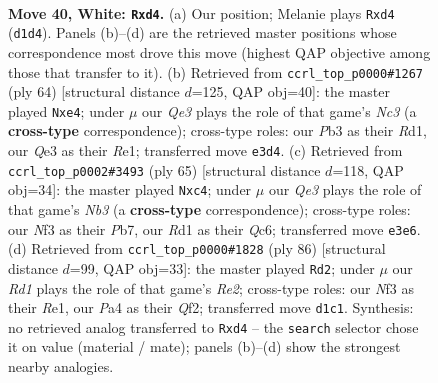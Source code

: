 \documentclass[11pt]{article}
\begin{document}
\clearpage

\begin{figure}[p]\centering
\begin{subfigure}{0.46\textwidth}\centering
\resizebox{\linewidth}{!}{%
\newchessgame
\chessboard[
  setfen={rnbr1q2/1p4k1/4p3/p4p1p/PnNp1P2/1P2QNP1/4B1KP/3R3R w - - 0 40},
  showmover=false,
  pgfstyle=straightmove, color=movearrow, markmove={d1-d4}
]}
\caption{}
\end{subfigure}\hfill
\begin{subfigure}{0.46\textwidth}\centering
\resizebox{\linewidth}{!}{%
\newchessgame
\chessboard[
  setfen={b1r3k1/2q1b1p1/p3pn2/2p2r2/2N1p2p/2NB1P2/PP1Q2PP/3RR2K w - - 0 33},
  showmover=false,
  pgfstyle=straightmove, color=movearrow, markmove={c3-e4}
]}
\caption{}
\end{subfigure}
\\[4pt]
\begin{subfigure}{0.46\textwidth}\centering
\resizebox{\linewidth}{!}{%
\newchessgame
\chessboard[
  setfen={2r5/1p3rkp/1nqp2p1/4p3/2P1PpP1/PQ1N1P2/2R4P/3R3K b - - 4 33},
  showmover=false,
  pgfstyle=straightmove, color=movearrow, markmove={b6-c4}
]}
\caption{}
\end{subfigure}\hfill
\begin{subfigure}{0.46\textwidth}\centering
\resizebox{\linewidth}{!}{%
\newchessgame
\chessboard[
  setfen={3r2k1/1b1qr1p1/p3pp1p/P7/1pNP4/1PnB2PP/4RQPK/4R3 w - - 31 44},
  showmover=false,
  pgfstyle=straightmove, color=movearrow, markmove={e2-d2}
]}
\caption{}
\end{subfigure}
\caption{\textbf{Move 40, White: \texttt{Rxd4}.} (a) Our position; Melanie plays \texttt{Rxd4} (\texttt{d1d4}). Panels (b)--(d) are the retrieved master positions whose correspondence most drove this move (highest QAP objective among those that transfer to it). (b) Retrieved from \texttt{ccrl\_top\_p0000\#1267} (ply 64) [structural distance $d$=125, QAP obj=40]: the master played \texttt{Nxe4}; under $\mu$ our \emph{Qe3} plays the role of that game's \emph{Nc3} (a \textbf{cross-type} correspondence); cross-type roles: our \emph{P}b3 as their \emph{R}d1, our \emph{Q}e3 as their \emph{R}e1; transferred move \texttt{e3d4}. (c) Retrieved from \texttt{ccrl\_top\_p0002\#3493} (ply 65) [structural distance $d$=118, QAP obj=34]: the master played \texttt{Nxc4}; under $\mu$ our \emph{Qe3} plays the role of that game's \emph{Nb3} (a \textbf{cross-type} correspondence); cross-type roles: our \emph{N}f3 as their \emph{P}b7, our \emph{R}d1 as their \emph{Q}c6; transferred move \texttt{e3e6}. (d) Retrieved from \texttt{ccrl\_top\_p0000\#1828} (ply 86) [structural distance $d$=99, QAP obj=33]: the master played \texttt{Rd2}; under $\mu$ our \emph{Rd1} plays the role of that game's \emph{Re2}; cross-type roles: our \emph{N}f3 as their \emph{R}e1, our \emph{P}a4 as their \emph{Q}f2; transferred move \texttt{d1c1}. Synthesis: no retrieved analog transferred to \texttt{Rxd4} -- the \texttt{search} selector chose it on value (material / mate); panels (b)--(d) show the strongest nearby analogies.}
\label{fig:thought-m78}
\end{figure}
\end{document}
